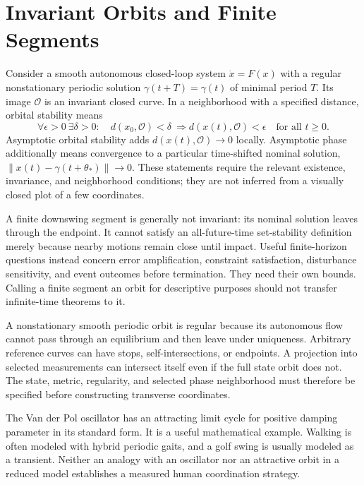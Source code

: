 \documentclass[12pt, openany]{book}
\theoremstyle{plain}
\begin{document}
\section{Invariant Orbits and Finite Segments}

Consider a smooth autonomous closed-loop system $\dot x=F(x)$ with a regular
nonstationary periodic solution $\gamma(t+T)=\gamma(t)$ of minimal period $T$.
Its image $\mathcal O$ is an invariant closed curve. In a neighborhood with a
specified distance, orbital stability means
\begin{equation}\label{eq:orbital_stability}
 \forall\epsilon>0\ \exists\delta>0:\quad
 d(x_0,\mathcal O)<\delta\ \Longrightarrow
 d(x(t),\mathcal O)<\epsilon\quad\text{for all }t\geq0.
\end{equation}
Asymptotic orbital stability adds $d(x(t),\mathcal O)\to0$ locally. Asymptotic
phase additionally means convergence to a particular time-shifted nominal
solution, $\|x(t)-\gamma(t+\theta_*)\|\to0$. These statements require the
relevant existence, invariance, and neighborhood conditions; they are not
inferred from a visually closed plot of a few coordinates.

A finite downswing segment is generally not invariant: its nominal solution
leaves through the endpoint. It cannot satisfy an all-future-time set-stability
definition merely because nearby motions remain close until impact. Useful
finite-horizon questions instead concern error amplification, constraint
satisfaction, disturbance sensitivity, and event outcomes before termination.
They need their own bounds. Calling a finite segment an orbit for descriptive
purposes should not transfer infinite-time theorems to it.

A nonstationary smooth periodic orbit is regular because its autonomous flow
cannot pass through an equilibrium and then leave under uniqueness. Arbitrary
reference curves can have stops, self-intersections, or endpoints. A projection
into selected measurements can intersect itself even if the full state orbit
does not. The state, metric, regularity, and selected phase neighborhood must
therefore be specified before constructing transverse coordinates.

The Van der Pol oscillator has an attracting limit cycle for positive damping
parameter in its standard form. It is a useful mathematical example. Walking
is often modeled with hybrid periodic gaits, and a golf swing is usually modeled
as a transient. Neither an analogy with an oscillator nor an attractive orbit
in a reduced model establishes a measured human coordination strategy.
\end{document}
